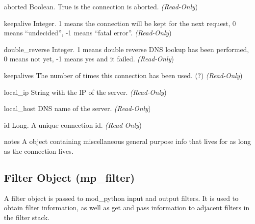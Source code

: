 \begin{memberdesc}[connection]{aborted}
  Boolean. True is the connection is aborted.
  \emph{(Read-Only})
\end{memberdesc}

\begin{memberdesc}[connection]{keepalive}
  Integer. 1 means the connection will be kept for the next request, 0 means
  ``undecided'', -1 means ``fatal error''.
  \emph{(Read-Only})
\end{memberdesc}

\begin{memberdesc}[connection]{double_reverse}
  Integer. 1 means double reverse DNS lookup has been performed, 0 means
  not yet, -1 means yes and it failed.
  \emph{(Read-Only})
\end{memberdesc}

\begin{memberdesc}[connection]{keepalives}
  The number of times this connection has been used. (?)
  \emph{(Read-Only})
\end{memberdesc}

\begin{memberdesc}[connection]{local_ip}
  String with the IP of the server.
  \emph{(Read-Only})
\end{memberdesc}

\begin{memberdesc}[connection]{local_host}
  DNS name of the server.
  \emph{(Read-Only})
\end{memberdesc}

\begin{memberdesc}[connection]{id}
  Long. A unique connection id.
  \emph{(Read-Only})
\end{memberdesc}

\begin{memberdesc}[connection]{notes}
  A  object containing miscellaneous general purpose info that lives for
  as long as the connection lives. 
\end{memberdesc}

\subsection{Filter Object (mp_filter)\label{pyapi-mpfilt}}

A filter object is passed to mod_python input and output filters. It
is used to obtain filter information, as well as get and pass
information to adjacent filters in the filter stack.

